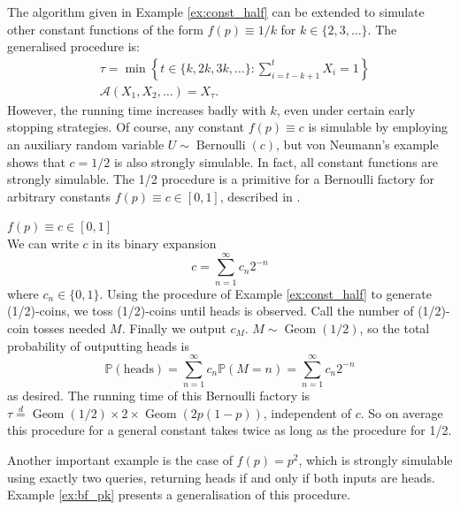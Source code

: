\documentclass{article}
\theoremstyle{definition}
\newenvironment{example}
  {\pushQED{\qed}\renewcommand{\qedsymbol}{$\triangle$}\examplex}
  {\popQED\endexamplex}
\newcommand{\PR}{\mathbb{P}}
\newcommand{\eqdist}{\overset{d}{=}}
\newcommand{\Bern}{\operatorname{Bernoulli}}
\newcommand{\Geom}{\operatorname{Geom}}
\newcommand{\A}{\mathcal{A}}
\begin{document}
The algorithm given in Example \ref{ex:const_half} can be extended to simulate other constant functions of the form $f(p)\equiv 1/k$ for $k\in \{2,3,\dots\}$. The generalised procedure is:
\begin{align*}
& \tau = \min\left\{ t \in \{k,2k,3k,\dots\} : \sum_{i=t-k+1}^t X_{i} = 1 \right\} \\
& \A(X_1,X_2,\dots) = X_\tau.
\end{align*}
However, the running time increases badly with $k$, even under certain early stopping strategies.
Of course, any constant $f(p)\equiv c$ is simulable by employing an auxiliary random variable $U\sim \Bern(c)$, but von Neumann's example shows that $c=1/2$ is also strongly simulable.
In fact, all constant functions are strongly simulable. The 1/2 procedure is a primitive for a Bernoulli factory for arbitrary constants $f(p)\equiv c\in[0,1]$, described in \citet[Proposition 13]{nacu2005}.

\begin{example}\label{ex:general_const}
$f(p)\equiv c\in[0,1]$ \\
We can write $c$ in its binary expansion
\begin{equation*}
c = \sum_{n=1}^\infty c_n 2^{-n}
\end{equation*}
where $c_n \in \{0,1\}$.
Using the procedure of Example \ref{ex:const_half} to generate (1/2)-coins, we toss (1/2)-coins until heads is observed. Call the number of (1/2)-coin tosses needed $M$. Finally we output $c_M$.
$M \sim \Geom(1/2)$, so the total probability of outputting heads is
\begin{equation*}
\PR(\text{heads}) = \sum_{n=1}^\infty c_n \PR(M=n) = \sum_{n=1}^\infty c_n 2^{-n}
\end{equation*}
as desired.
The running time of this Bernoulli factory is $\tau \eqdist \Geom(1/2)\times 2 \times \Geom(2p(1-p))$, independent of $c$. So on average this procedure for a general constant takes twice as long as the procedure for 1/2.
\end{example}

Another important example is the case of $f(p)=p^2$, which is strongly simulable using exactly two queries, returning heads if and only if both inputs are heads. Example \ref{ex:bf_pk} presents a generalisation of this procedure.
\end{document}
